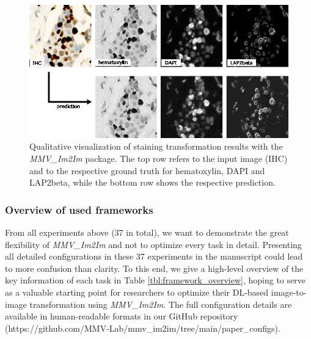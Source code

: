 \begin{figure}
\hypertarget{fig:multiplex}{%
\centering
\includegraphics{images/multiplex_justin.png}
\caption{Qualitative visualization of staining transformation results with the \emph{MMV\_Im2Im} package. The top row refers to the input image (IHC) and to the respective ground truth for hematoxylin, DAPI and LAP2beta, while the bottom row shows the respective prediction.}\label{fig:multiplex}
}
\end{figure}

\hypertarget{overview-of-used-frameworks}{%
\subsubsection{Overview of used frameworks}\label{overview-of-used-frameworks}}

From all experiments above (37 in total), we want to demonstrate the great flexibility of \emph{MMV\_Im2Im} and not to optimize every task in detail. Presenting all detailed configurations in these 37 experiments in the manuscript could lead to more confusion than clarity. To this end, we give a high-level overview of the key information of each task in Table \ref{tbl:framework_overview}, hoping to serve as a valuable starting point for researchers to optimize their DL-based image-to-image transformation using \emph{MMV\_Im2Im}. The full configuration details are available in human-readable formats in our GitHub repository (https://github.com/MMV-Lab/mmv\_im2im/tree/main/paper\_configs).

